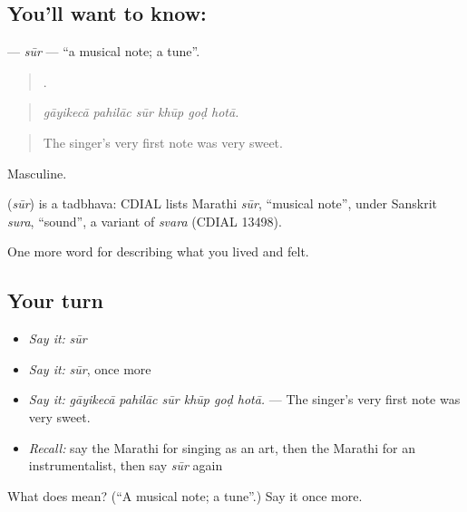 \subsection*{You'll want to know: }
\textbf{} — \emph{sūr} — \textquotedblleft{}a musical note; a tune\textquotedblright{}.

\begin{quote}
     .
\end{quote}

\begin{quote}
\emph{gāyikecā pahilāc sūr khūp goḍ hotā.}
\end{quote}

\begin{quote}
The singer's very first note was very sweet.
\end{quote}

Masculine.

\begin{cousinweb}
\textbf{} (\emph{sūr}) is a tadbhava: CDIAL lists Marathi \emph{sūr}, \textquotedblleft{}musical note\textquotedblright{}, under Sanskrit \emph{sura}, \textquotedblleft{}sound\textquotedblright{}, a variant of \emph{svara} (CDIAL 13498).
\end{cousinweb}

\begin{grammarlens}[title={What you've built}]
One more word for describing what you lived and felt.
\end{grammarlens}

\subsection*{Your turn}
\begin{itemize}
\raggedright
  \item \emph{Say it:} \emph{sūr}
  \item \emph{Say it:} \emph{sūr}, once more
  \item \emph{Say it:} \emph{gāyikecā pahilāc sūr khūp goḍ hotā.} — The singer's very first note was very sweet.
  \item \emph{Recall:} say the Marathi for singing as an art, then the Marathi for an instrumentalist, then say \emph{sūr} again
\end{itemize}

\begin{tcolorbox}[breakable,colback=teal!4,colframe=teal!35!black,title={Before you move on}]
What does  mean? (\textquotedblleft{}A musical note; a tune\textquotedblright{}.) Say it once more.
\end{tcolorbox}
